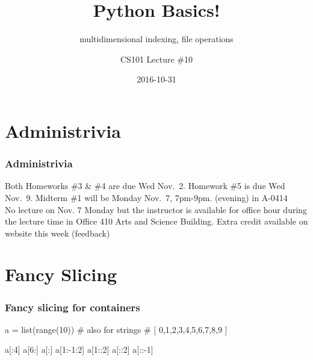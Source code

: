 \documentclass[11pt]{beamer}
\title{Python Basics!}
\subtitle{multidimensional indexing, file operations}
\author{CS101 Lecture \#10}
\date{2016-10-31}
\begin{document}
  \setcounter{showProgressBar}{0}
  \setcounter{showSlideNumbers}{0}

\frame{\titlepage}

\setcounter{framenumber}{0}
\setcounter{showProgressBar}{1}
\setcounter{showSlideNumbers}{1}


\section{Administrivia}

\begin{frame}
	\frametitle{Administrivia}
	\Enlarge
	\begin{itemize}
		\myitem  Both Homeworks \#3 \& \#4 are due Wed Nov.\ 2.
		\myitem  Homework \#5 is due Wed Nov.\ 9.
		\myitem  Midterm \#1 will be Monday Nov.\ 7, 7pm-9pm.  (evening) in A-0414\\ \textcolor{CS101GradBot}{No lecture on Nov. 7 Monday but the instructor is available for office hour during the lecture time in Office 410 Arts and Science Building.}
	   \myitem  Extra credit available on website this week (feedback)
	\end{itemize}
\end{frame}


\section{Fancy Slicing}

\begin{frame}[fragile]
  \frametitle{Fancy slicing for containers}
  \Enlarge

  \begin{semiverbatim}
a = list(range(10))  # also for strings %
#   [ 0,1,2,3,4,5,6,7,8,9 ] %

a[:4]      %
a[6:]      %
a[:]       %
a[1:-1:2]  %
a[1::2]    %
a[::2]     %
a[::-1]    %
  \end{semiverbatim}
\end{frame}
\end{document}
